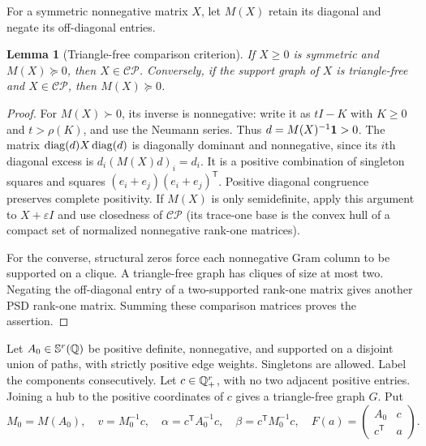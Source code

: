 \documentclass[11pt]{article}
\newtheorem{lemma}[theorem]{Lemma}
\theoremstyle{definition}\newtheorem{definition}[theorem]{Definition}
\theoremstyle{remark}\newtheorem{remark}[theorem]{Remark}
\newcommand{\CP}{\mathcal{CP}}\newcommand{\COP}{\mathcal{COP}}\newcommand{\Ry}{\mathcal R}
\newcommand{\T}{^{\mathsf T}}\newcommand{\norm}[1]{\lVert #1\rVert}
\begin{document}
For a symmetric nonnegative matrix $X$, let $M(X)$ retain its diagonal and negate its off-diagonal entries.

\begin{lemma}[Triangle-free comparison criterion]\label{lem:comparison}
If $X\ge0$ is symmetric and $M(X)\succeq0$, then $X\in\CP$. Conversely, if the support graph of $X$ is triangle-free and $X\in\CP$, then $M(X)\succeq0$.
\end{lemma}
\begin{proof}
For $M(X)\succ0$, its inverse is nonnegative: write it as $tI-K$ with $K\ge0$ and $t>\rho(K)$, and use the Neumann series. Thus $d=M(X)^{-1}{\bf1}>0$. The matrix $\operatorname{diag}(d)X\operatorname{diag}(d)$ is diagonally dominant and nonnegative, since its $i$th diagonal excess is $d_i(M(X)d)_i=d_i$. It is a positive combination of singleton squares and squares $(e_i+e_j)(e_i+e_j)\T$. Positive diagonal congruence preserves complete positivity. If $M(X)$ is only semidefinite, apply this argument to $X+\varepsilon I$ and use closedness of $\CP$ (its trace-one base is the convex hull of a compact set of normalized nonnegative rank-one matrices).

For the converse, structural zeros force each nonnegative Gram column to be supported on a clique. A triangle-free graph has cliques of size at most two. Negating the off-diagonal entry of a two-supported rank-one matrix gives another PSD rank-one matrix. Summing these comparison matrices proves the assertion.
\end{proof}

Let $A_0\in\mathbb S^r(\mathbb Q)$ be positive definite, nonnegative, and supported on a disjoint union of paths, with strictly positive edge weights. Singletons are allowed. Label the components consecutively. Let $c\in\mathbb Q_+^r$, with no two adjacent positive entries. Joining a hub to the positive coordinates of $c$ gives a triangle-free graph $G$. Put
\[
 M_0=M(A_0),\quad v=M_0^{-1}c,\quad
 \alpha=c\T A_0^{-1}c,\quad\beta=c\T M_0^{-1}c,\quad
 F(a)=\begin{pmatrix}A_0&c\\c\T&a\end{pmatrix}.
\]
\end{document}
